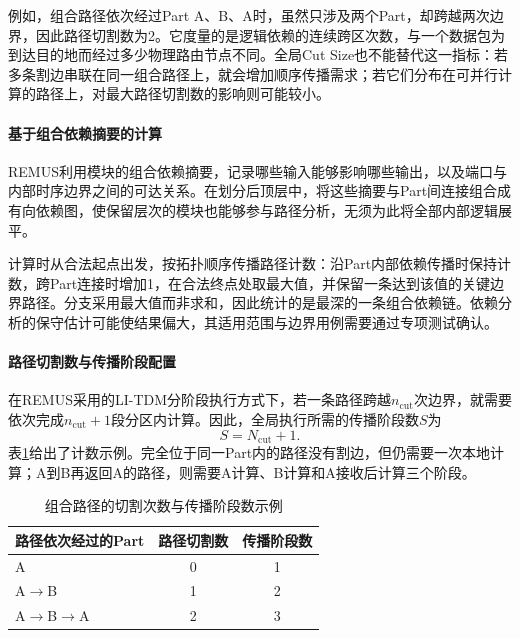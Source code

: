 例如，组合路径依次经过Part A、B、A时，虽然只涉及两个Part，却跨越两次边界，因此路径切割数为2。它度量的是逻辑依赖的连续跨区次数，与一个数据包为到达目的地而经过多少物理路由节点不同。全局Cut Size也不能替代这一指标：若多条割边串联在同一组合路径上，就会增加顺序传播需求；若它们分布在可并行计算的路径上，对最大路径切割数的影响则可能较小。

\paragraph{基于组合依赖摘要的计算}

REMUS利用模块的组合依赖摘要，记录哪些输入能够影响哪些输出，以及端口与内部时序边界之间的可达关系。在划分后顶层中，将这些摘要与Part间连接组合成有向依赖图，使保留层次的模块也能够参与路径分析，无须为此将全部内部逻辑展平。

计算时从合法起点出发，按拓扑顺序传播路径计数：沿Part内部依赖传播时保持计数，跨Part连接时增加1，在合法终点处取最大值，并保留一条达到该值的关键边界路径。分支采用最大值而非求和，因此统计的是最深的一条组合依赖链。依赖分析的保守估计可能使结果偏大，其适用范围与边界用例需要通过专项测试确认。

\paragraph{路径切割数与传播阶段配置}

在REMUS采用的LI-TDM分阶段执行方式下，若一条路径跨越$n_{\mathrm{cut}}$次边界，就需要依次完成$n_{\mathrm{cut}}+1$段分区内计算。因此，全局执行所需的传播阶段数$S$为
\begin{equation}
    S=N_{\mathrm{cut}}+1.
    \label{eq:midterm-path-cut-stages}
\end{equation}
表\ref{tab:midterm-path-cut-example}给出了计数示例。完全位于同一Part内的路径没有割边，但仍需要一次本地计算；A到B再返回A的路径，则需要A计算、B计算和A接收后计算三个阶段。

\begin{table}[htbp]
    \centering
    \caption{组合路径的切割次数与传播阶段数示例}
    \label{tab:midterm-path-cut-example}
    \begin{tabular}{@{}lcc@{}}
        \toprule
        路径依次经过的Part   & 路径切割数 & 传播阶段数 \\
        \midrule
        A             & 0     & 1     \\
        A$\to$B       & 1     & 2     \\
        A$\to$B$\to$A & 2     & 3     \\
        \bottomrule
    \end{tabular}
\end{table}

